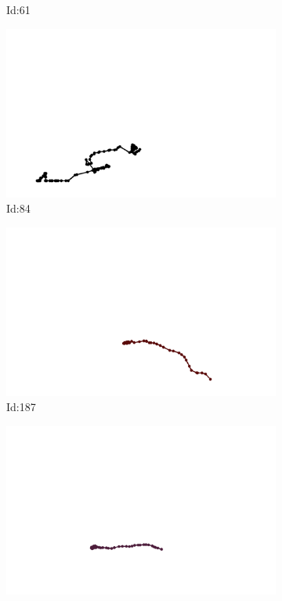 \documentclass[12pt,twoside]{report}
\begin{document}
\begin{figure}
\begin{subfigure}[b]{0.20\textwidth}
\caption{Id:61}
\end{subfigure}
\begin{subfigure}[b]{0.20\textwidth}
\centering
\includegraphics[width=\textwidth]{../trajectories/84.png}
\caption{Id:84}
\end{subfigure}
\begin{subfigure}[b]{0.20\textwidth}
\centering
\includegraphics[width=\textwidth]{../trajectories/187.png}
\caption{Id:187}
\end{subfigure}
\begin{subfigure}[b]{0.20\textwidth}
\centering
\includegraphics[width=\textwidth]{../trajectories/197.png}

\end{subfigure}
\end{figure}
\end{document}
